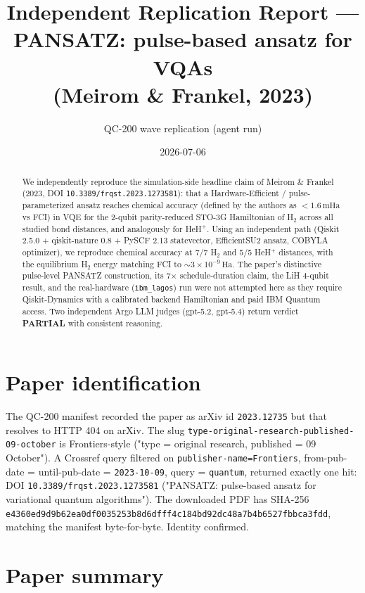 \documentclass[11pt,letterpaper]{article}
\title{Independent Replication Report ---\\ PANSATZ: pulse-based ansatz for VQAs\\ (Meirom \& Frankel, 2023)}
\author{QC-200 wave replication (agent run)}
\date{2026-07-06}
\begin{document}
\maketitle

\begin{abstract}
We independently reproduce the simulation-side headline claim of Meirom \& Frankel (2023, DOI \texttt{10.3389/frqst.2023.1273581}): that a Hardware-Efficient / pulse-parameterized ansatz reaches chemical accuracy (defined by the authors as $<1.6\,\text{mHa}$ vs FCI) in VQE for the 2-qubit parity-reduced STO-3G Hamiltonian of H$_2$ across all studied bond distances, and analogously for HeH$^+$. Using an independent path (Qiskit 2.5.0 + qiskit-nature 0.8 + PySCF 2.13 statevector, EfficientSU2 ansatz, COBYLA optimizer), we reproduce chemical accuracy at 7/7 H$_2$ and 5/5 HeH$^+$ distances, with the equilibrium H$_2$ energy matching FCI to $\sim 3\times 10^{-9}\,\text{Ha}$. The paper's distinctive pulse-level PANSATZ construction, its 7$\times$ schedule-duration claim, the LiH 4-qubit result, and the real-hardware (\texttt{ibm\_lagos}) run were not attempted here as they require Qiskit-Dynamics with a calibrated backend Hamiltonian and paid IBM Quantum access. Two independent Argo LLM judges (gpt-5.2, gpt-5.4) return verdict \textbf{PARTIAL} with consistent reasoning.
\end{abstract}

\section{Paper identification}

The QC-200 manifest recorded the paper as arXiv id \texttt{2023.12735} but that resolves to HTTP 404 on arXiv. The slug \texttt{type-original-research-published-09-october} is Frontiers-style ("type = original research, published = 09 October"). A Crossref query filtered on \texttt{publisher-name=Frontiers}, from-pub-date = until-pub-date = \texttt{2023-10-09}, query = \texttt{quantum}, returned exactly one hit: DOI \texttt{10.3389/frqst.2023.1273581} ("PANSATZ: pulse-based ansatz for variational quantum algorithms"). The downloaded PDF has SHA-256 \texttt{e4360ed9d9b62ea0df0035253b8d6dfff4c184bd92dc48a7b4b6527fbbca3fdd}, matching the manifest byte-for-byte. Identity confirmed.

\section{Paper summary}
\end{document}
